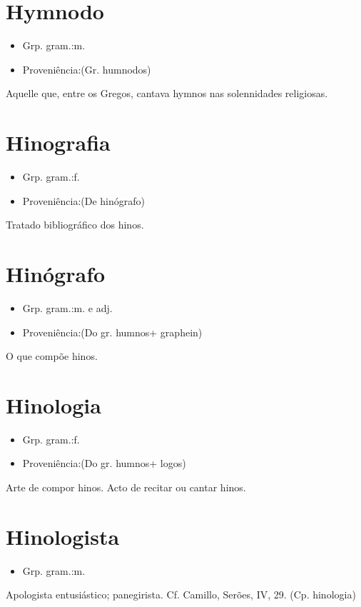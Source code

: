 \documentclass{article}
\begin{document}
\section{Hymnodo}
\begin{itemize}
\item {Grp. gram.:m.}
\end{itemize}
\begin{itemize}
\item {Proveniência:(Gr. \textunderscore humnodos\textunderscore )}
\end{itemize}
Aquelle que, entre os Gregos, cantava hymnos nas solennidades religiosas.
\section{Hinografia}
\begin{itemize}
\item {Grp. gram.:f.}
\end{itemize}
\begin{itemize}
\item {Proveniência:(De \textunderscore hinógrafo\textunderscore )}
\end{itemize}
Tratado bibliográfico dos hinos.
\section{Hinógrafo}
\begin{itemize}
\item {Grp. gram.:m.  e  adj.}
\end{itemize}
\begin{itemize}
\item {Proveniência:(Do gr. \textunderscore humnos\textunderscore  + \textunderscore graphein\textunderscore )}
\end{itemize}
O que compõe hinos.
\section{Hinologia}
\begin{itemize}
\item {Grp. gram.:f.}
\end{itemize}
\begin{itemize}
\item {Proveniência:(Do gr. \textunderscore humnos\textunderscore  + \textunderscore logos\textunderscore )}
\end{itemize}
Arte de compor hinos.
Acto de recitar ou cantar hinos.
\section{Hinologista}
\begin{itemize}
\item {Grp. gram.:m.}
\end{itemize}
Apologista entusiástico; panegirista. Cf. Camillo, \textunderscore Serões\textunderscore , IV, 29.
(Cp. \textunderscore hinologia\textunderscore )
\end{document}
